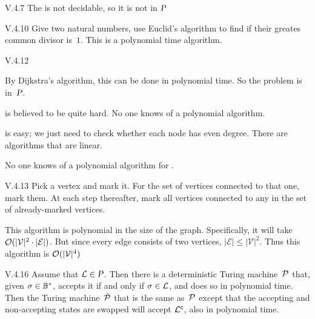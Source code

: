 %
\begin{ans}{V.4.7}
The \HP{} is not decidable, so it is not in $\P$
\end{ans}
%
%
%
\begin{ans}{V.4.10}
Give two natural numbers,
use Euclid's algorithm to find if their greates common divisor is~$1$.
This is a polynomial time algorithm.
\end{ans}
%
%
\begin{ans}{V.4.12}
\begin{exparts}
\item By Dijkstra's algorithm, this can be done in polynomial time.
  So the problem is in~$\P$.
\item {} is believed to be quite hard.
  No one knows of a polynomial algorithm.
\item {} is easy; we just need to check whether each
  node has even degree.
  There are algorithms that are linear.
\item No one knows of a polynomial algorithm for
  .
\end{exparts}
\end{ans}
%
\begin{ans}{V.4.13}
Pick a vertex and mark it.
For the set of vertices connected to that one, mark them.
At each step thereafter, mark all vertices connected to any in the set
of already-marked vertices.

This algorithm is polynomial in the size of the graph.
Specifically, it will take $\bigOh(|\mathcal{V}|^2\cdot|\mathcal{E}|)$.
But since every edge consists of two vertices,
$|\mathcal{E}|\leq|\mathcal{V}|^2$.
Thus this algorithm is $\bigOh(|\mathcal{V}|^4)$
\end{ans}
%
%
%
\begin{ans}{V.4.16}
Assume that $\prob\in\P$.
Then there is a deterministic Turing machine~$\TM$ that,
given $\sigma\in\kleenestar{\B}$, accepts it if and only if $\sigma\in\prob$,
and does so in polynomial time.
Then the Turing machine~$\hat{\TM}$ that is the same as~$\TM$ except that the
accepting and non-accepting states are swapped will accept
$\setcomp{\prob}$, also in polynomial time.
\end{ans}
